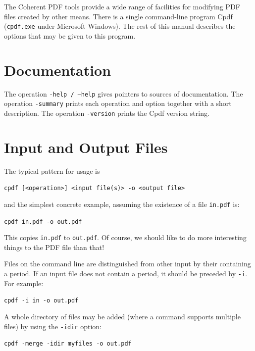 \documentclass{book}
\begin{document}
  The Coherent PDF tools provide a wide range of facilities for modifying PDF
files created by other means. There is a single command-line program
Cpdf (\texttt{cpdf.exe} under Microsoft Windows). The rest of this manual describes the options that may be given
to this program.

\section{Documentation}

The operation \texttt{-help / --help} gives pointers to sources of documentation. The operation \texttt{-summary} prints each operation and option together with a short description. The operation \texttt{-version} prints the Cpdf version string.

   
  \section{Input and Output Files}
  The typical pattern for usage is

  \begin{framed}
  \noindent\small\verb!cpdf [<operation>] <input file(s)> -o <output file>!
  \end{framed}

  \noindent and the simplest concrete example, assuming the existence of a file
\texttt{in.pdf} is:

  \begin{framed}
  \noindent\small\verb!cpdf in.pdf -o out.pdf!
  \end{framed}

  \noindent This copies \texttt{in.pdf} to \texttt{out.pdf}. Of course, we should like to do more interesting
things to the PDF file than that!

  Files on the command line are distinguished from other input by their
containing a period. If an input file does not contain a period, it should be
preceded by \verb!-i!. For example:

  \begin{framed}
  \noindent\small\verb!cpdf -i in -o out.pdf!
  \end{framed}

\noindent A whole directory of files may be added (where a command supports multiple files) by using the \verb!-idir! option:

  \begin{framed}
  \noindent\small\verb!cpdf -merge -idir myfiles -o out.pdf!
  \end{framed}
\end{document}

